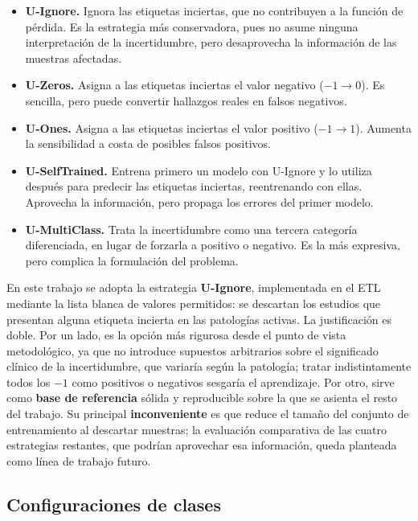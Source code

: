 \begin{itemize}
  \item \textbf{U-Ignore.} Ignora las etiquetas inciertas, que no contribuyen a la
        función de pérdida. Es la estrategia más conservadora, pues no asume
        ninguna interpretación de la incertidumbre, pero desaprovecha la
        información de las muestras afectadas.
  \item \textbf{U-Zeros.} Asigna a las etiquetas inciertas el valor negativo
        ($-1 \rightarrow 0$). Es sencilla, pero puede convertir hallazgos reales
        en falsos negativos.
  \item \textbf{U-Ones.} Asigna a las etiquetas inciertas el valor positivo
        ($-1 \rightarrow 1$). Aumenta la sensibilidad a costa de posibles falsos
        positivos.
  \item \textbf{U-SelfTrained.} Entrena primero un modelo con U-Ignore y lo
        utiliza después para predecir las etiquetas inciertas, reentrenando con
        ellas. Aprovecha la información, pero propaga los errores del primer
        modelo.
  \item \textbf{U-MultiClass.} Trata la incertidumbre como una tercera categoría
        diferenciada, en lugar de forzarla a positivo o negativo. Es la más
        expresiva, pero complica la formulación del problema.
\end{itemize}

En este trabajo se adopta la estrategia \textbf{U-Ignore}, implementada en el ETL
mediante la lista blanca de valores permitidos: se descartan los estudios que
presentan alguna etiqueta incierta en las patologías activas. La justificación es
doble. Por un lado, es la opción más rigurosa desde el punto de vista
metodológico, ya que no introduce supuestos arbitrarios sobre el significado
clínico de la incertidumbre, que variaría según la patología; tratar
indistintamente todos los $-1$ como positivos o negativos sesgaría el aprendizaje.
Por otro, sirve como \textbf{base de referencia} sólida y reproducible sobre la
que se asienta el resto del trabajo. Su principal \textbf{inconveniente} es que
reduce el tamaño del conjunto de entrenamiento al descartar muestras; la
evaluación comparativa de las cuatro estrategias restantes, que podrían
aprovechar esa información, queda planteada como línea de trabajo futuro.

\subsection{Configuraciones de clases}

